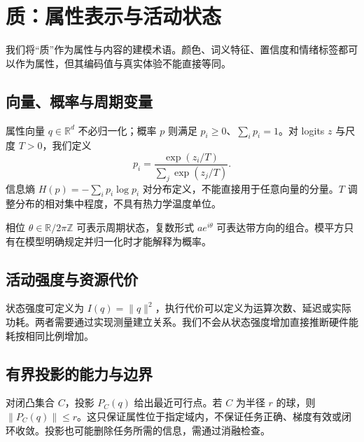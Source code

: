 \chapter{质：属性表示与活动状态}
\label{chp:qualia_activation}
\label{sec:qualia_definition}
\label{sec:qualia_elements}
\label{sec:activation_field}
\label{sec:qualia_function}

我们将“质”作为属性与内容的建模术语。颜色、词义特征、置信度和情绪标签都可以作为属性，但其编码值与真实体验不能直接等同。
\section{向量、概率与周期变量}
属性向量 $q\in\mathbb{R}^d$ 不必归一化；概率 $p$ 则满足 $p_i\ge0$、$\sum_i p_i=1$。对 logits $z$ 与尺度 $T>0$，我们定义
\begin{equation}p_i=\frac{\exp(z_i/T)}{\sum_j\exp(z_j/T)}.\end{equation}
信息熵 $H(p)=-\sum_i p_i\log p_i$ 对分布定义，不能直接用于任意向量的分量。$T$ 调整分布的相对集中程度，不具有热力学温度单位。

相位 $\theta\in\mathbb{R}/2\pi\mathbb{Z}$ 可表示周期状态，复数形式 $a e^{i\theta}$ 可表达带方向的组合。模平方只有在模型明确规定并归一化时才能解释为概率。
\section{活动强度与资源代价}
状态强度可定义为 $I(q)=\|q\|^2$，执行代价可以定义为运算次数、延迟或实际功耗。两者需要通过实现测量建立关系。我们不会从状态强度增加直接推断硬件能耗按相同比例增加。
\section{有界投影的能力与边界}
对闭凸集合 $C$，投影 $P_C(q)$ 给出最近可行点。若 $C$ 为半径 $r$ 的球，则 $\|P_C(q)\|\le r$。这只保证属性位于指定域内，不保证任务正确、梯度有效或闭环收敛。投影也可能删除任务所需的信息，需通过消融检查。
